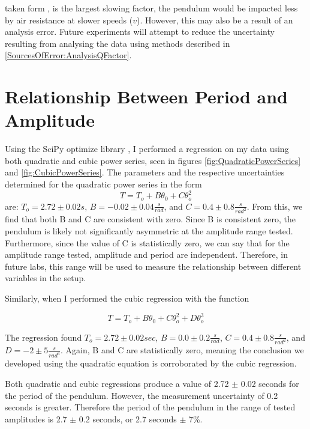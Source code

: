 \documentclass[11pt]{article}
\begin{document}
            taken form \cite{nasa_2015}, is the largest slowing factor, the pendulum would be impacted less by air resistance at slower speeds ($v$). However, this may also be a result of an analysis error. Future experiments will attempt to reduce the uncertainty resulting from analysing the data using methods described in \ref{SourcesOfError:AnalysisQFactor}.

    \section{Relationship Between Period and Amplitude}\label{PeriodVsAmp}
        Using the SciPy optimize library \cite{2020SciPy-NMeth}, I performed a regression on my data using both quadratic and cubic power series, seen in figures \ref{fig:QuadraticPowerSeries} and \ref{fig:CubicPowerSeries}. The parameters and the respective uncertainties determined for the quadratic power series in the form 
        \begin{equation}
            T = T_{o} + B\theta_{0} + C\theta_{o}^{2}
        \end{equation}
        are: $T_o = 2.72 \pm 0.02 s$, $B = -0.02 \pm 0.04 \frac{s}{rad}$, and $C = 0.4 \pm 0.8 \frac{s}{rad^2}$. From this, we find that both B and C are consistent with zero. Since B is consistent zero, the pendulum is likely not significantly asymmetric at the amplitude range tested. Furthermore, since the value of C is statistically zero, we can say that for the amplitude range tested, amplitude and period are independent. Therefore, in future labs, this range will be used to measure the relationship between different variables in the setup. 
        
        Similarly, when I performed the cubic regression with the function 
        
        \begin{equation}
            T = T_{o} + B\theta_{0} + C\theta_{o}^{2} + D\theta_{o}^3
            \label{eq:PeriodVsAmp}
        \end{equation}
        
        The regression found $T_o = 2.72 \pm 0.02 sec$, $B = 0.0 \pm 0.2 \frac{s}{rad}$,  $C = 0.4 \pm 0.8 \frac{s}{rad^2}$, and $D = -2 \pm 5 \frac{s}{rad^3}$. Again, B and C are statistically zero, meaning the conclusion we developed using the quadratic equation is corroborated by the cubic regression.

        Both quadratic and cubic regressions produce a value of 2.72 $\pm$ 0.02 seconds for the period of the pendulum. However, the measurement uncertainty of 0.2 seconds is greater. Therefore the period of the pendulum in the range of tested amplitudes is 2.7 $\pm$ 0.2 seconds, or 2.7 seconds $\pm$ 7\%.
\end{document}
